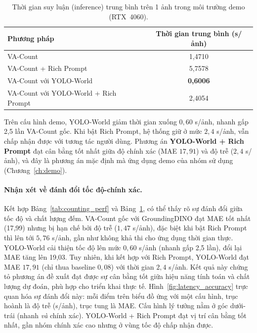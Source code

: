 \documentclass[a4paper,12pt]{report}
\numberwithin{figure}{chapter}
\numberwithin{table}{chapter}
\begin{document}
\begin{table}[H]
\centering
\renewcommand{\arraystretch}{1.2}
\begin{tabular}{|l|c|}
\hline
\rowcolor[HTML]{EFEFEF}
\textbf{Phương pháp} & \textbf{Thời gian trung bình (s/ảnh)} \\
\hline
VA-Count & 1,4710 \\
\hline
VA-Count + Rich Prompt & 5,7578 \\
\hline
VA-Count với YOLO-World & \textbf{0,6006} \\
\hline
VA-Count với YOLO-World + Rich Prompt & 2,4054 \\
\hline
\end{tabular}
\caption{Thời gian suy luận (inference) trung bình trên 1 ảnh trong môi trường demo (RTX~4060).}
\label{tab:demo_time}
\end{table}

Trên cấu hình demo, YOLO-World giảm thời gian xuống $0{,}60$ s/ảnh, nhanh gấp 2,5 lần VA-Count gốc. Khi bật Rich Prompt, hệ thống giữ ở mức $2{,}4$ s/ảnh, vẫn chấp nhận được với tương tác người dùng. Phương án \textbf{YOLO-World + Rich Prompt} đạt cân bằng tốt nhất giữa độ chính xác (MAE $17{,}91$) và độ trễ ($2{,}4$ s/ảnh), và đây là phương án mặc định mà ứng dụng demo của nhóm sử dụng (Chương~\ref{ch:demo}).

\paragraph{Nhận xét về đánh đổi tốc độ-chính xác.}
Kết hợp Bảng~\ref{tab:counting_perf} và Bảng~\ref{tab:demo_time}, có thể thấy rõ sự đánh đổi giữa tốc độ và chất lượng đếm. VA-Count gốc với GroundingDINO đạt MAE tốt nhất (17,99) nhưng bị hạn chế bởi độ trễ ($1{,}47$ s/ảnh), đặc biệt khi bật Rich Prompt thì lên tới $5{,}76$ s/ảnh, gần như không khả thi cho ứng dụng thời gian thực. YOLO-World cải thiện tốc độ lên mức $0{,}60$ s/ảnh (nhanh gấp 2,5 lần), đổi lại MAE tăng lên 19,03. Tuy nhiên, khi kết hợp với Rich Prompt, YOLO-World đạt MAE $17{,}91$ (chỉ thua baseline $0{,}08$) với thời gian $2{,}4$ s/ảnh. Kết quả này chứng tỏ phương án đề xuất đạt được sự cân bằng tốt giữa hiệu năng tính toán và chất lượng dự đoán, phù hợp cho triển khai thực tế.
Hình~\ref{fig:latency_accuracy} trực quan hóa sự đánh đổi này: mỗi điểm trên biểu đồ ứng với một cấu hình, trục hoành là độ trễ (s/ảnh), trục tung là MAE. Cấu hình lý tưởng nằm ở góc dưới-trái (nhanh \emph{và} chính xác). YOLO-World + Rich Prompt đạt vị trí cân bằng tốt nhất, gần nhóm chính xác cao nhưng ở vùng tốc độ chấp nhận được.
\end{document}
